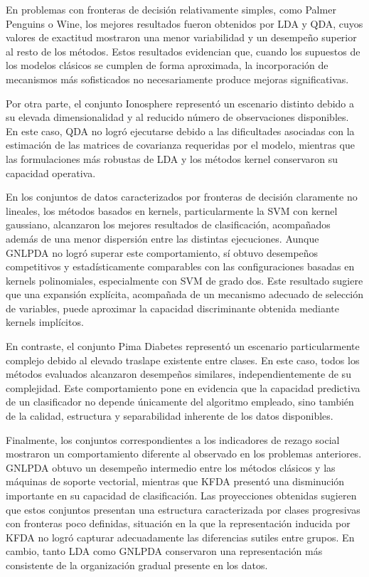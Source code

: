 En problemas con fronteras de decisión relativamente simples, como Palmer Penguins o Wine, los mejores resultados fueron obtenidos por LDA y QDA, cuyos valores de exactitud mostraron una menor variabilidad y un desempeño superior al resto de los métodos. Estos resultados evidencian que, cuando los supuestos de los modelos clásicos se cumplen de forma aproximada, la incorporación de mecanismos más sofisticados no necesariamente produce mejoras significativas.

Por otra parte, el conjunto Ionosphere representó un escenario distinto debido a su elevada dimensionalidad y al reducido número de observaciones disponibles. En este caso, QDA no logró ejecutarse debido a las dificultades asociadas con la estimación de las matrices de covarianza requeridas por el modelo, mientras que las formulaciones más robustas de LDA y los métodos kernel conservaron su capacidad operativa.

En los conjuntos de datos caracterizados por fronteras de decisión claramente no lineales, los métodos basados en kernels, particularmente la SVM con kernel gaussiano, alcanzaron los mejores resultados de clasificación, acompañados además de una menor dispersión entre las distintas ejecuciones. Aunque GNLPDA no logró superar este comportamiento, sí obtuvo desempeños competitivos y estadísticamente comparables con las configuraciones basadas en kernels polinomiales, especialmente con SVM de grado dos. Este resultado sugiere que una expansión explícita, acompañada de un mecanismo adecuado de selección de variables, puede aproximar la capacidad discriminante obtenida mediante kernels implícitos.

En contraste, el conjunto Pima Diabetes representó un escenario particularmente complejo debido al elevado traslape existente entre clases. En este caso, todos los métodos evaluados alcanzaron desempeños similares, independientemente de su complejidad. Este comportamiento pone en evidencia que la capacidad predictiva de un clasificador no depende únicamente del algoritmo empleado, sino también de la calidad, estructura y separabilidad inherente de los datos disponibles.

Finalmente, los conjuntos correspondientes a los indicadores de rezago social mostraron un comportamiento diferente al observado en los problemas anteriores. GNLPDA obtuvo un desempeño intermedio entre los métodos clásicos y las máquinas de soporte vectorial, mientras que KFDA presentó una disminución importante en su capacidad de clasificación.
Las proyecciones obtenidas sugieren que estos conjuntos presentan una estructura caracterizada por clases progresivas con fronteras poco definidas, situación en la que la representación inducida por KFDA no logró capturar adecuadamente las diferencias sutiles entre grupos. En cambio, tanto LDA como GNLPDA conservaron una representación más consistente de la organización gradual presente en los datos.

